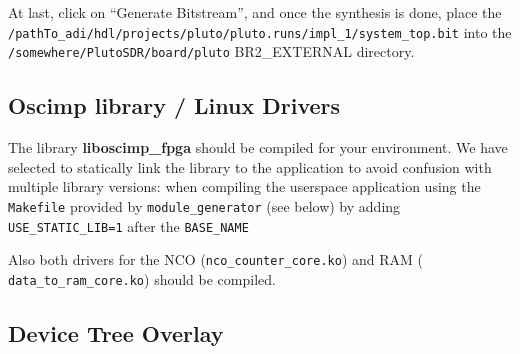 \documentclass{article}
\begin{document}
At last, click on ``Generate Bitstream'', and once the synthesis is done, place
the \\{\tt /pathTo\_adi/hdl/projects/pluto/pluto.runs/impl\_1/system\_top.bit}
into the \\{\tt /somewhere/PlutoSDR/board/pluto} BR2\_EXTERNAL directory.

\subsection{Oscimp library / Linux Drivers}
The library {\bf{liboscimp\_fpga}} should be compiled for your environment. We have selected
to statically link the library to the application to avoid confusion with multiple library
versions: when compiling the userspace application using the {\tt Makefile} provided by
{\tt module\_generator} (see below) by adding {\tt USE\_STATIC\_LIB=1} after the
{\tt BASE\_NAME}

Also both drivers for the NCO ({\tt nco\_counter\_core.ko}) and RAM ({\tt
data\_to\_ram\_core.ko}) should be compiled. 

\subsection{Device Tree Overlay}

%
%
%
%
%
%
%
%
%
%
%
\end{document}
